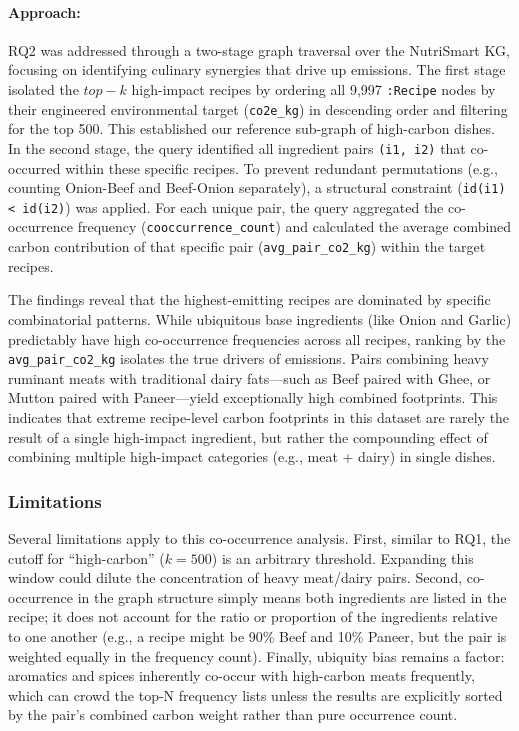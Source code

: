 \documentclass{article}
\begin{document}
\paragraph{Approach:}
RQ2 was addressed through a two-stage graph traversal over the NutriSmart KG, focusing on identifying culinary synergies that drive up emissions. The first stage isolated the $top-k$ high-impact recipes by ordering all 9{,}997 \texttt{:Recipe} nodes by their engineered environmental target (\texttt{co2e\_kg}) in descending order and filtering for the top 500. This established our reference sub-graph of high-carbon dishes. In the second stage, the query identified all ingredient pairs \texttt{(i1, i2)} that co-occurred within these specific recipes. To prevent redundant permutations (e.g., counting Onion-Beef and Beef-Onion separately), a structural constraint (\texttt{id(i1) < id(i2)}) was applied. For each unique pair, the query aggregated the co-occurrence frequency (\texttt{cooccurrence\_count}) and calculated the average combined carbon contribution of that specific pair (\texttt{avg\_pair\_co2\_kg}) within the target recipes. 

The findings reveal that the highest-emitting recipes are dominated by specific combinatorial patterns. While ubiquitous base ingredients (like Onion and Garlic) predictably have high co-occurrence frequencies across all recipes, ranking by the \texttt{avg\_pair\_co2\_kg} isolates the true drivers of emissions. Pairs combining heavy ruminant meats with traditional dairy fats—such as Beef paired with Ghee, or Mutton paired with Paneer—yield exceptionally high combined footprints. This indicates that extreme recipe-level carbon footprints in this dataset are rarely the result of a single high-impact ingredient, but rather the compounding effect of combining multiple high-impact categories (e.g., meat + dairy) in single dishes.

\subsubsection*{Limitations}
Several limitations apply to this co-occurrence analysis. First, similar to RQ1, the cutoff for ``high-carbon'' ($k=500$) is an arbitrary threshold. Expanding this window could dilute the concentration of heavy meat/dairy pairs. Second, co-occurrence in the graph structure simply means both ingredients are listed in the recipe; it does not account for the ratio or proportion of the ingredients relative to one another (e.g., a recipe might be 90\% Beef and 10\% Paneer, but the pair is weighted equally in the frequency count). Finally, ubiquity bias remains a factor: aromatics and spices inherently co-occur with high-carbon meats frequently, which can crowd the top-N frequency lists unless the results are explicitly sorted by the pair's combined carbon weight rather than pure occurrence count.
\end{document}
